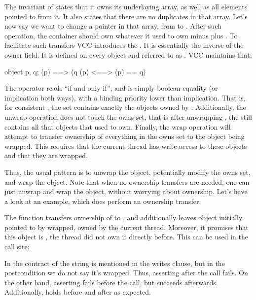 \noindent
The invariant of  states that it owns its underlaying array,
as well as all elements pointed to from it.
It also states that there are no duplicates in that array.
Let's now say we want to change a pointer in that array,
from  to .
After such operation, the container should own whatever it used
to own minus  plus .
To facilitate such transfers VCC introduces the .
It is essentially the inverse of the owner field.
It is defined on every object  and referred to as .
VCC maintains that:
\begin{VCC}
\forall object p, q; \consistent(p) ==> 
  (q \in \owns(p) <==> \owner(p) == q)
\end{VCC}
The operator \vcc{<==>} reads ``if and only if'', and is simply boolean
equality (or implication both ways), with a binding priority lower than implication.
That is, for consistent , the set  contains exactly
the objects owned by .
Additionally, the unwrap operation does not touch the owns set,
that is after unwrapping , the  still contains
all that objects that  used to own.
Finally, the wrap operation will attempt to transfer ownership
of everything in the owns set to the object being wrapped.
This requires that the current thread has write access to these objects
and that they are wrapped.

Thus, the usual pattern is to unwrap the object, potentially modify the owns
set, and wrap the object.
Note that when no ownership transfers are needed, one can just unwrap
and wrap the object, without worrying about ownership.
Let's have a look at an example, which does perform an ownership transfer:


\noindent
The  function transfers ownership of  to ,
and additionally leaves object initially pointed to by 
wrapped, \ie owned by the current thread.
Moreover, it promises that this object is , \ie the thread did not own
it directly before.
This can be used in the call site:


\noindent
In the contract of  the string  is mentioned
in the writes clause, but in the postcondition we do not say it's wrapped.
Thus, asserting  after the call fails.
On the other hand, asserting  fails before the call,
but succeeds afterwards.
Additionally,  holds before and after as expected.

